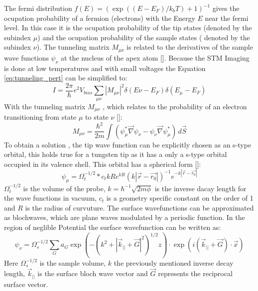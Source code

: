 \noindent The fermi distribution $f(E)= (\exp((E-E_F)/k_b T)+1)^{-1}$ gives the ocupation probability of a fermion (electrons) with the Energy $E$ near the fermi level.
In this case it is the ocupation probability of the tip states (denoted by the subindex $\mu$) and the ocupation probability of the sample states ( denoted by the subindex $\nu$).
The tunneling matrix $M_{\mu \nu}$ is related to the derivatives of the sample wave functions $\psi_{\nu} $ at the nucleus of the apex atom [\cite{tunnelmatrix}].
Because the STM Imaging is done at low temperatures and with small voltages the Equation \ref{eq:tunneling_pert} can be simplified to:
\begin{equation}
    I = \frac{2 \pi}{\hbar} e^2 V_{bias} \sum_{\mu \nu}  |M_{\mu \nu}|^2 \delta(E{\nu}-E_F) \delta(E_{\mu}- E_{F})
    \label{eq:tunneling_pert_simple}
\end{equation}
With the tunneling matrix $M_{\mu \nu}$ , which relates to the probability of an electron transitioning from state $\mu$ to state $\nu$ [\cite{tunnelmatrix}]: 
\begin{equation}
    M_{\mu \nu} = \frac{\hbar^2}{2m} \int (\psi_{\mu}^{*} \vec{\nabla} \psi_{\nu} - \psi_{\nu} \vec{\nabla} \psi_{\mu}^{*}) \, d\vec{S}
    \label{eq:tunnelin_matrix}
\end{equation}
To obtain a solution  , the tip wave function can be explicitly chosen as an s-type orbital, this holds true for a tungsten tip as it has a only a s-type orbital occupied in its valence shell.
This orbital has a spherical form [\cite{PhysRevLett}]:
\begin{equation}
    \psi_{\mu} = \Omega_t^{-1/2} * c_t k R e^{kR} ( k|\vec{r}- \vec{r_0}|)^{-1} e^{-k|\vec{r}- \vec{r_0}|}
    \label{eq:tip_wave}
\end{equation}
$\Omega_t^{-1/2}$ is the volume of the probe, $k = \hbar^{-1} \sqrt{2m\phi}$ is the inverse dacay length for the wave functions in vacuum, $c_t$ is a geometry specific constant on the order of 1 and $R$ is the radius of curvuture.
The surface wavefunctions can be approximated as blochwaves, which are plane waves modulated by a periodic function.
In the region of neglible Potential the surface wavefunction can be written as:
\begin{equation}
    \psi_{\nu} = \Omega_{s}^{-1/2} \sum_{G} a_G \exp(- (k^2 + |\vec{k}_{||} + \vec{G}|^2)^{1/2} z)\cdot \exp(i(\vec{k}_{||} + \vec{G})\cdot \vec{x})
    \label{eq:surface_wave}
\end{equation}
Here $\Omega_{s}^{-1/2}$ is the sample volume, $k$ the previously mentioned inverse decay length, $\vec{k}_{||}$ is the surface bloch wave vector and $\vec{G}$ represents the reciprocal surface vector.
